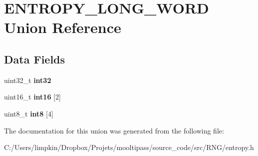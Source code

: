 \hypertarget{union_e_n_t_r_o_p_y___l_o_n_g___w_o_r_d}{\section{E\+N\+T\+R\+O\+P\+Y\+\_\+\+L\+O\+N\+G\+\_\+\+W\+O\+R\+D Union Reference}
\label{union_e_n_t_r_o_p_y___l_o_n_g___w_o_r_d}
}
\subsection*{Data Fields}
\begin{DoxyCompactItemize}
\item 
\hypertarget{union_e_n_t_r_o_p_y___l_o_n_g___w_o_r_d_adfb304a74bc0ee2042775783a2ed5ff5}{uint32\+\_\+t {\bfseries int32}}\label{union_e_n_t_r_o_p_y___l_o_n_g___w_o_r_d_adfb304a74bc0ee2042775783a2ed5ff5}

\item 
\hypertarget{union_e_n_t_r_o_p_y___l_o_n_g___w_o_r_d_af8ada64e3c4ccfbccce2b3331b60b8db}{uint16\+\_\+t {\bfseries int16} \mbox{[}2\mbox{]}}\label{union_e_n_t_r_o_p_y___l_o_n_g___w_o_r_d_af8ada64e3c4ccfbccce2b3331b60b8db}

\item 
\hypertarget{union_e_n_t_r_o_p_y___l_o_n_g___w_o_r_d_a52885b169d6ed0ec05af81f6f4809442}{uint8\+\_\+t {\bfseries int8} \mbox{[}4\mbox{]}}\label{union_e_n_t_r_o_p_y___l_o_n_g___w_o_r_d_a52885b169d6ed0ec05af81f6f4809442}

\end{DoxyCompactItemize}


The documentation for this union was generated from the following file\+:\begin{DoxyCompactItemize}
\item 
C\+:/\+Users/limpkin/\+Dropbox/\+Projets/mooltipass/source\+\_\+code/src/\+R\+N\+G/entropy.\+h\end{DoxyCompactItemize}
